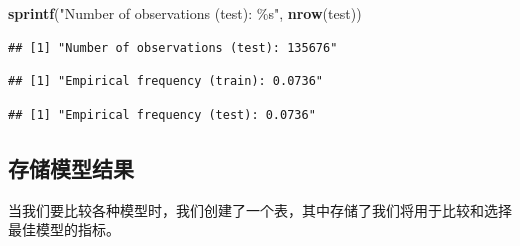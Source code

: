 \documentclass[
]{article}
\newenvironment{Shaded}{\begin{snugshade}}{\end{snugshade}}
\newcommand{\CommentTok}[1]{\textcolor[rgb]{0.56,0.35,0.01}{\textit{#1}}}
\newcommand{\DecValTok}[1]{\textcolor[rgb]{0.00,0.00,0.81}{#1}}
\newcommand{\FunctionTok}[1]{\textcolor[rgb]{0.13,0.29,0.53}{\textbf{#1}}}
\newcommand{\NormalTok}[1]{#1}
\newcommand{\SpecialCharTok}[1]{\textcolor[rgb]{0.81,0.36,0.00}{\textbf{#1}}}
\newcommand{\StringTok}[1]{\textcolor[rgb]{0.31,0.60,0.02}{#1}}
\begin{document}
\begin{Shaded}
\begin{Highlighting}[]
\FunctionTok{sprintf}\NormalTok{(}\StringTok{"Number of observations (test): \%s"}\NormalTok{, }\FunctionTok{nrow}\NormalTok{(test))}
\end{Highlighting}
\end{Shaded}

\begin{verbatim}
## [1] "Number of observations (test): 135676"
\end{verbatim}

\begin{Shaded}
\end{Shaded}

\begin{verbatim}
## [1] "Empirical frequency (train): 0.0736"
\end{verbatim}

\begin{Shaded}
\end{Shaded}

\begin{verbatim}
## [1] "Empirical frequency (test): 0.0736"
\end{verbatim}

\subsection{存储模型结果}\label{ux5b58ux50a8ux6a21ux578bux7ed3ux679c}

当我们要比较各种模型时，我们创建了一个表，其中存储了我们将用于比较和选择最佳模型的指标。
\end{document}
